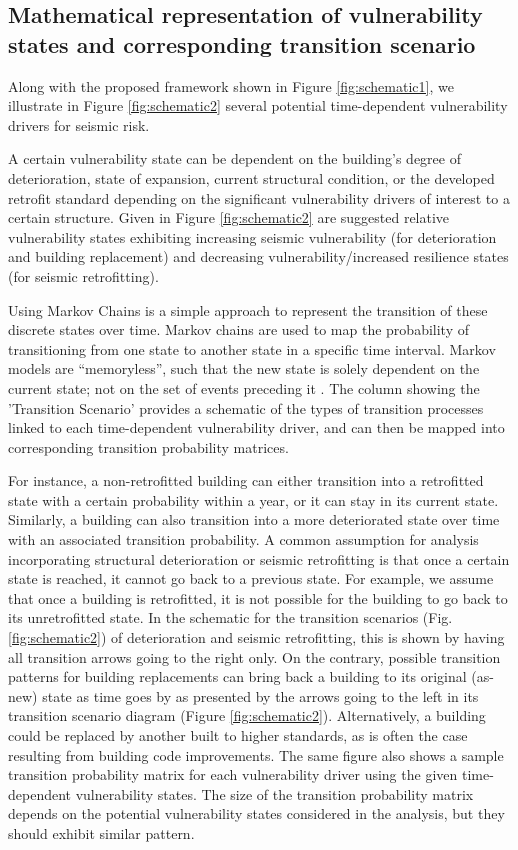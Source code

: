 
\subsection{Mathematical representation of vulnerability states and corresponding transition scenario}

Along with the proposed framework shown in Figure \ref{fig:schematic1}, we illustrate in Figure \ref{fig:schematic2} several potential time-dependent vulnerability drivers for seismic risk.

A certain vulnerability state can be dependent on the building's degree of deterioration, state of expansion, current structural condition, or the developed retrofit standard depending on the significant vulnerability drivers of interest to a certain structure. Given in Figure \ref{fig:schematic2} are suggested relative vulnerability states exhibiting increasing seismic vulnerability (for deterioration and building replacement) and decreasing vulnerability/increased resilience states (for seismic retrofitting).

Using Markov Chains is a simple approach to represent the transition of these discrete states over time. Markov chains are used to map the probability of transitioning from one state to another state in a specific time interval. Markov models are “memoryless”, such that the new state is solely dependent on the current state; not on the set of events preceding it \citep{agresti2003categorical}. The column showing the 'Transition Scenario' provides a schematic of the types of transition processes linked to each time-dependent vulnerability driver, and can then be mapped into corresponding transition probability matrices.

For instance, a non-retrofitted building can either transition into a retrofitted state with a certain probability within a year, or it can stay in its current state. Similarly, a building can also transition into a more deteriorated state over time with an associated transition probability. A common assumption for analysis incorporating structural deterioration or seismic retrofitting is that once a certain state is reached, it cannot go back to a previous state. For example, we assume that once a building is retrofitted, it is not possible for the building to go back to its unretrofitted state. In the schematic for the transition scenarios (Fig. \ref{fig:schematic2}) of deterioration and seismic retrofitting, this is shown by having all transition arrows going to the right only.
On the contrary, possible transition patterns for building replacements can bring back a building to its original (as-new) state as time goes by as presented by the arrows going to the left in its transition scenario diagram (Figure \ref{fig:schematic2}). Alternatively, a building could be replaced by another built to higher standards, as is often the case resulting from building code improvements. The same figure also shows a sample transition probability matrix for each vulnerability driver using the given time-dependent vulnerability states. The size of the transition probability matrix depends on the potential vulnerability states considered in the analysis, but they should exhibit similar pattern. 

